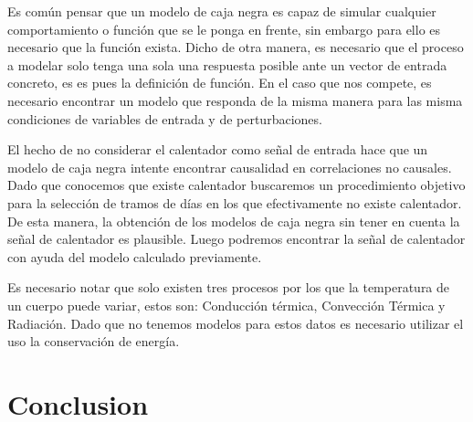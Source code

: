 Es común pensar que un modelo de caja negra es capaz de simular cualquier comportamiento o función que se le ponga en frente, sin embargo para ello es necesario que la función exista. Dicho de otra manera, es necesario que el proceso a modelar solo tenga una sola una respuesta posible ante un  vector de entrada concreto, es es pues la definición de función. En el caso que nos compete, es necesario encontrar un modelo que responda de la misma manera para las misma condiciones de variables de entrada y de perturbaciones. 

El hecho de no considerar el calentador como señal de entrada hace que un modelo de caja negra intente encontrar causalidad en correlaciones no causales. Dado que conocemos que existe calentador buscaremos un procedimiento objetivo para la selección de tramos de días en los que efectivamente no existe calentador. De esta manera, la obtención de los modelos de caja negra sin tener en cuenta la señal de calentador es plausible. Luego podremos encontrar la señal de calentador con ayuda del modelo calculado previamente.

Es necesario notar que solo existen tres procesos por los que la temperatura de un cuerpo puede variar, estos son: Conducción térmica, Convección Térmica y Radiación. Dado que no tenemos modelos para estos datos es necesario utilizar el uso la conservación de energía.  

\section{Conclusion}


